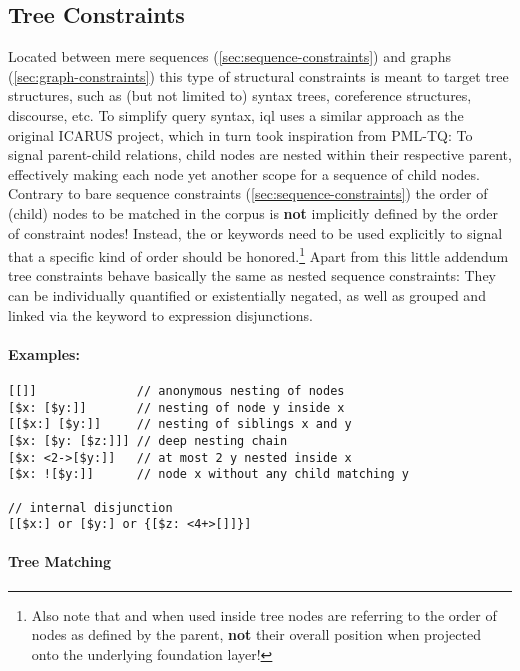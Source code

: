 \documentclass[11pt,a4paper]{report}
\begin{document}
\subsection{Tree Constraints}
\label{sec:tree-constraints}

Located between mere sequences (\ref{sec:sequence-constraints}) and graphs (\ref{sec:graph-constraints}) this type of structural constraints is meant to target tree structures, such as (but not limited to) syntax trees, coreference structures, discourse, etc.
To simplify query syntax, \ac{iql} uses a similar approach as the original ICARUS project, which in turn took inspiration from PML-TQ:
To signal parent-child relations, child nodes are nested within their respective parent, effectively making each node yet another scope for a sequence of child nodes.
Contrary to bare sequence constraints (\ref{sec:sequence-constraints}) the order of (child) nodes to be matched in the corpus is \textbf{not} implicitly defined by the order of constraint nodes!
Instead, the  or  keywords need to be used explicitly to signal that a specific kind of order should be honored.\footnote{Also note that  and  when used inside tree nodes are referring to the order of nodes as defined by the parent, \textbf{not} their overall position when projected onto the underlying foundation layer!}
Apart from this little addendum tree constraints behave basically the same as nested sequence constraints:
They can be individually quantified or existentially negated, as well as grouped and linked via the  keyword to expression disjunctions.

\paragraph{Examples:}

\begin{Verbatim}[samepage=true]
[[]]              // anonymous nesting of nodes
[$x: [$y:]]       // nesting of node y inside x
[[$x:] [$y:]]     // nesting of siblings x and y
[$x: [$y: [$z:]]] // deep nesting chain 
[$x: <2->[$y:]]   // at most 2 y nested inside x
[$x: ![$y:]]      // node x without any child matching y

// internal disjunction
[[$x:] or [$y:] or {[$z: <4+>[]]}]
\end{Verbatim}

\paragraph{Tree Matching}
\end{document}
